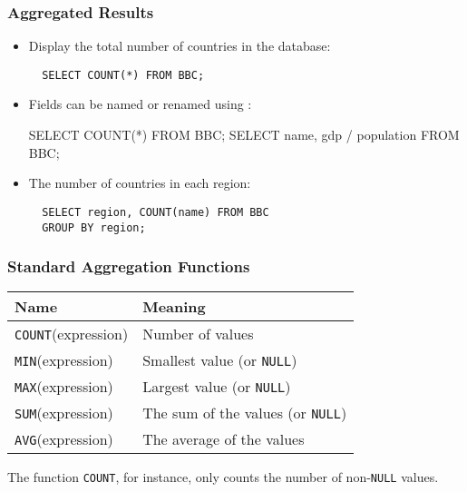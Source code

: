 \documentclass[dvipsnames]{beamer}
\begin{document}
\begin{frame}[fragile]
\frametitle{Aggregated Results}

  \begin{itemize}[<+->]
  \item Display the total number of countries in the database:
    \begin{small}
\begin{verbatim}
  SELECT COUNT(*) FROM BBC;
\end{verbatim}
    \end{small}

  \item Fields can be named or renamed using :
    \begin{small}
\begin{semiverbatim}
  SELECT COUNT(*)  FROM BBC;
  SELECT name, gdp / population  FROM BBC;
\end{semiverbatim}
    \end{small}


  \item The number of countries in each region:
    \begin{small}
\begin{verbatim}
  SELECT region, COUNT(name) FROM BBC 
  GROUP BY region;
\end{verbatim}
    \end{small}
  \end{itemize}
\end{frame}

\begin{frame}\frametitle{Standard Aggregation Functions}

\begin{center}
\begin{tabular}{ll}\hline\hline
\textbf{Name} & \textbf{Meaning}\\\hline
\texttt{COUNT}(expression) & Number of values \\
\texttt{MIN}(expression) & Smallest value (or \texttt{NULL}) \\
\texttt{MAX}(expression) & Largest value (or \texttt{NULL}) \\
\texttt{SUM}(expression) & The sum of the values (or \texttt{NULL}) \\
\texttt{AVG}(expression) & The average of the values \\\hline\hline
\end{tabular}
\end{center}


The function \texttt{COUNT}, for instance, only counts the number of
non-\texttt{NULL} values.
  
\end{frame}
\end{document}
